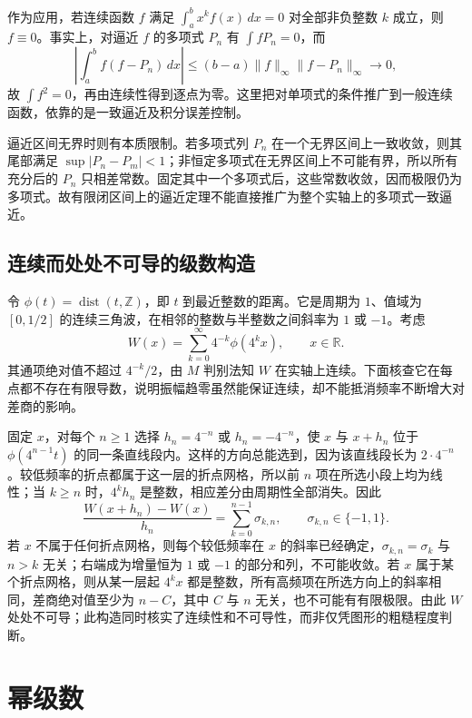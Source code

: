 作为应用，若连续函数 $f$ 满足 $\int_a^bx^kf(x)\,dx=0$ 对全部非负整数 $k$ 成立，则 $f\equiv0$。事实上，对逼近 $f$ 的多项式 $P_n$ 有 $\int fP_n=0$，而
\[
 \left|\int_a^bf(f-P_n)\,dx\right|
 \leq(b-a)\|f\|_\infty\|f-P_n\|_\infty\longrightarrow0,
\]
故 $\int f^2=0$，再由连续性得到逐点为零。这里把对单项式的条件推广到一般连续函数，依靠的是一致逼近及积分误差控制。

逼近区间无界时则有本质限制。若多项式列 $P_n$ 在一个无界区间上一致收敛，则其尾部满足 $\sup|P_n-P_m|<1$；非恒定多项式在无界区间上不可能有界，所以所有充分后的 $P_n$ 只相差常数。固定其中一个多项式后，这些常数收敛，因而极限仍为多项式。故有限闭区间上的逼近定理不能直接推广为整个实轴上的多项式一致逼近。

\subsection{连续而处处不可导的级数构造}

令 $\phi(t)=\operatorname{dist}(t,\mathbb Z)$，即 $t$ 到最近整数的距离。它是周期为 $1$、值域为 $[0,1/2]$ 的连续三角波，在相邻的整数与半整数之间斜率为 $1$ 或 $-1$。考虑
\begin{equation}
 W(x)=\sum_{k=0}^{\infty}4^{-k}\phi(4^kx),\qquad x\in\mathbb R.
 \label{eq:pei-nowhere-differentiable}
\end{equation}
其通项绝对值不超过 $4^{-k}/2$，由 $M$ 判别法知 $W$ 在实轴上连续。下面核查它在每点都不存在有限导数，说明振幅趋零虽然能保证连续，却不能抵消频率不断增大对差商的影响。

固定 $x$，对每个 $n\geq1$ 选择 $h_n=4^{-n}$ 或 $h_n=-4^{-n}$，使 $x$ 与 $x+h_n$ 位于 $\phi(4^{n-1}t)$ 的同一条直线段内。这样的方向总能选到，因为该直线段长为 $2\cdot4^{-n}$。较低频率的折点都属于这一层的折点网格，所以前 $n$ 项在所选小段上均为线性；当 $k\geq n$ 时，$4^kh_n$ 是整数，相应差分由周期性全部消失。因此
\[
 \frac{W(x+h_n)-W(x)}{h_n}
 =\sum_{k=0}^{n-1}\sigma_{k,n},\qquad \sigma_{k,n}\in\{-1,1\}.
\]
若 $x$ 不属于任何折点网格，则每个较低频率在 $x$ 的斜率已经确定，$\sigma_{k,n}=\sigma_k$ 与 $n>k$ 无关；右端成为增量恒为 $1$ 或 $-1$ 的部分和列，不可能收敛。若 $x$ 属于某个折点网格，则从某一层起 $4^kx$ 都是整数，所有高频项在所选方向上的斜率相同，差商绝对值至少为 $n-C$，其中 $C$ 与 $n$ 无关，也不可能有有限极限。由此 $W$ 处处不可导；此构造同时核实了连续性和不可导性，而非仅凭图形的粗糙程度判断。

\section{幂级数}
\label{sec:pei-power-series}

